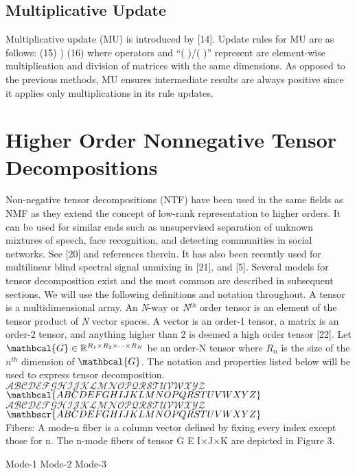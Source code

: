 \subsection{Multiplicative Update}
Multiplicative update (MU) is introduced by [14].   Update rules for MU are as follows:
(15)
)	(16)
where operators  and “(         )/(      )” represent are element-wise multiplication and division of matrices with the same dimensions.
As opposed to the previous methods, MU ensures intermediate results are always positive since it applies only multiplications in its rule updates.

\section{Higher Order Nonnegative Tensor Decompositions}
Non-negative tensor decompositions (NTF) have been used in the same fields as NMF as they extend the concept of low-rank representation to higher orders.  It can be used for similar ends such as unsupervised separation of unknown mixtures of speech, face recognition, and detecting communities in social networks.  See [20] and references therein.  It has also been recently used for multilinear blind spectral signal unmixing in [21], and [5].  Several models for tensor decomposition exist and the most common are described in subsequent sections.  We will use the following definitions and notation throughout.
A tensor is a multidimensional array.  An \textit{N}-way or \textit{N}$^{th}$ order tensor is an element of the tensor product of \textit{N} vector spaces.  A vector is an order-1 tensor, a matrix is an order-2 tensor, and anything higher than 2 is deemed a high order tensor [22].
Let 
$\mathbcal{G} \in \mathbb{R}^{
	R_1 \times R_2 \times\cdots\times R_N
}$
be an order-N tensor where $R_n$ is the size of the $n^{th}$ dimension of $\mathbcal{G}$.  The notation and properties listed below will be used to express tensor decomposition.\\
$\mathcal{ABCDEFGHIJKLMNOPQRSTUVWXYZ}$\\
$\mathbcal{ABCDEFGHIJKLMNOPQRSTUVWXYZ}$\\
$\mathscr{ABCDEFGHIJKLMNOPQRSTUVWXYZ}$\\
$\mathbscr{ABCDEFGHIJKLMNOPQRSTUVWXYZ}$\\
Fibers: 	A mode-n fiber is a column vector defined by fixing every index except those for n.  The n-mode fibers of tensor G E I×J×K are depicted in Figure 3.

Mode-1		Mode-2	Mode-3


